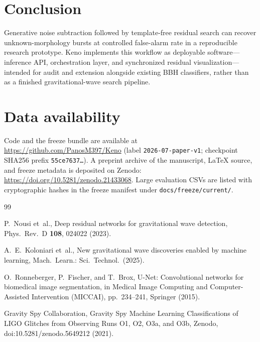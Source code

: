 \documentclass[11pt,a4paper]{article}
\begin{document}
\section{Conclusion}

Generative noise subtraction followed by template-free residual search can
recover unknown-morphology bursts at controlled false-alarm rate in a
reproducible research prototype. Keno implements this workflow as deployable
software---inference API, orchestration layer, and synchronized residual
visualization---intended for audit and extension alongside existing BBH
classifiers, rather than as a finished gravitational-wave search pipeline.

\section*{Data availability}
Code and the freeze bundle are available at
\url{https://github.com/PanosM397/Keno}
(label \texttt{2026-07-paper-v1}; checkpoint SHA256 prefix
\texttt{55ce7637\ldots}).
A preprint archive of the manuscript, \LaTeX{} source, and freeze metadata is
deposited on Zenodo:
\url{https://doi.org/10.5281/zenodo.21433068}.
Large evaluation CSVs are listed with cryptographic hashes in the freeze
manifest under \texttt{docs/freeze/current/}.


\begin{thebibliography}{99}

P.~Nousi et~al.,
\newblock Deep residual networks for gravitational wave detection,
\newblock Phys.\ Rev.\ D \textbf{108}, 024022 (2023).

A.~E.~Koloniari et~al.,
\newblock New gravitational wave discoveries enabled by machine learning,
\newblock Mach.\ Learn.: Sci.\ Technol.\ (2025).

O.~Ronneberger, P.~Fischer, and T.~Brox,
\newblock U-Net: Convolutional networks for biomedical image segmentation,
\newblock in Medical Image Computing and Computer-Assisted Intervention
(MICCAI), pp.~234--241, Springer (2015).

Gravity Spy Collaboration,
\newblock Gravity Spy Machine Learning Classifications of LIGO Glitches from
Observing Runs O1, O2, O3a, and O3b,
\newblock Zenodo, doi:10.5281/zenodo.5649212 (2021).

\end{thebibliography}
\end{document}
